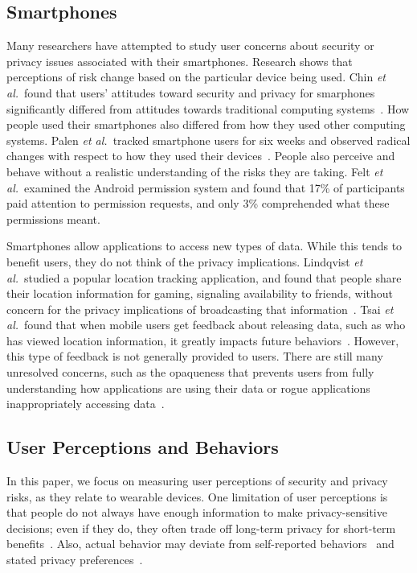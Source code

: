 \subsection{Smartphones}
Many researchers have attempted to study user concerns about security or privacy issues associated with their smartphones. Research shows that perceptions of risk change based on the particular device being used. Chin {\it et al.}\ found that users' attitudes toward security and privacy for smarphones significantly differed from attitudes towards traditional computing systems~\cite{chin2012measuring}. How people used their smartphones also differed from how they used other computing systems. Palen {\it et al.}\ tracked smartphone users for six weeks and observed radical changes with respect to how they used their devices~\cite{palen2000going}. People also perceive and behave without a realistic understanding of the risks they are taking. Felt {\it et al.}\ examined the Android permission system and found that 17\% of participants paid attention to permission requests, and only 3\% comprehended what these permissions meant.

Smartphones allow applications to access new types of data. While this tends to benefit users, they do not think of the privacy implications. Lindqvist {\it et al.}\  studied a popular location tracking application, and found that people share their location information for gaming, signaling availability to friends, without concern for the privacy implications of broadcasting that information~\cite{lindqvist2011m}. Tsai {\it et al.}\ found that when mobile users get feedback about releasing data, such as who has viewed location information, it greatly impacts future behaviors~\cite{Tsai2009}. However, this type of feedback is not generally provided to users. There are still many unresolved concerns, such as the opaqueness that prevents users from fully understanding how applications are using their data or rogue applications inappropriately accessing data~\cite{1_kane_2010, zhou2011taming}.


\subsection{User Perceptions and Behaviors}
In this paper, we focus on measuring user perceptions of security and privacy risks, as they relate to wearable devices. One limitation of user perceptions is that people do not always have enough information to make privacy-sensitive decisions; even if they do, they often trade off long-term privacy for short-term benefits~\cite{acquisti2005privacy}. Also, actual behavior may deviate from self-reported behaviors~\cite{jensen2005privacy} and stated privacy preferences~\cite{spiekermann2001privacy}.

